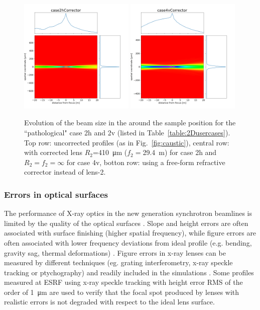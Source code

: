 \documentclass{iucr}              %
\begin{document}
\begin{figure}
\includegraphics[width=0.49\textwidth]{figures/case2hCorrector_caustic.png}
\includegraphics[width=0.49\textwidth]{figures/case4vCorrector_caustic.png}

\caption{Evolution of the beam size in the around the sample position for the ``pathological" case 2h and 2v (listed in Table~\ref{table:2Dusercases}). Top row: uncorrected profiles (as in Fig.~\ref{fig:caustic}), central row: with corrected lens $R_2$=\SI{410}{\micro\meter} ($f_2=$\SI{29.4}{\meter}) for case 2h and $R_2=f_2=\infty$ for case 4v, botton row: using a free-form refractive corrector instead of lens-2.
}
\end{figure}



\subsubsection{Errors in optical surfaces}

The performance of X-ray optics in the new generation synchrotron beamlines is limited by the quality of the optical surfaces \cite{lengeler1999,Yabashi}. Slope and height errors are often associated with surface finishing (higher spatial frequency), while figure errors are often associated with lower frequency deviations from ideal profile (e.g. bending, gravity sag, thermal deformations) \cite{srio1992, signorato1997}. Figure errors in x-ray lenses can be measured by different techniques (eg. grating interferometry, x-ray speckle tracking or ptychography) and readily included in the simulations \cite{celestre2020}. Some profiles measured at ESRF using x-ray speckle tracking \cite{berujon2020} with height error RMS of the order of \SI{1}{\micro\meter} are used to verify that the focal spot produced by lenses with realistic errors is not degraded with respect to the ideal lens surface. 
\end{document}
